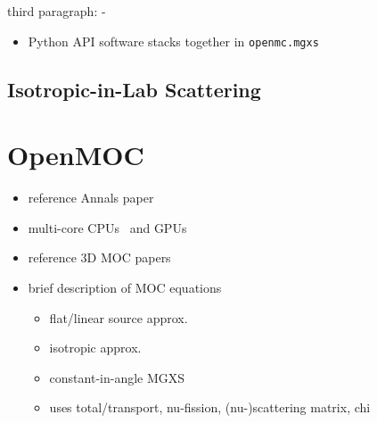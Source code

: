 third paragraph:
-

\begin{itemize}[noitemsep]
  \item Python \ac{API} software stacks together in \texttt{openmc.mgxs}
\end{itemize}

\subsection{Isotropic-in-Lab Scattering}
\label{sec:chap3-iso-in-lab}


\section{OpenMOC}
\label{sec:chap3-openmoc}

\begin{itemize}[noitemsep]
  \item reference Annals paper~\cite{boyd2014openmoc}
  \item multi-core CPUs~\cite{boyd2016parallel} and GPUs~\cite{boyd2013massively}
  \item reference 3D \ac{MOC} papers
  \item brief description of \ac{MOC} equations
  \begin{itemize}[noitemsep]
    \item flat/linear source approx.
    \item isotropic approx.
    \item constant-in-angle \ac{MGXS}
    \item uses total/transport, nu-fission, (nu-)scattering matrix, chi
  \end{itemize}
\end{itemize}

